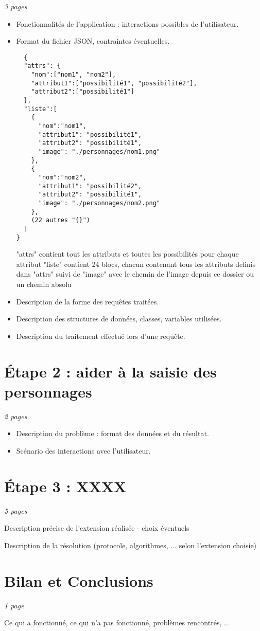 \documentclass[a4paper]{article}
\begin{document}
\emph{3 pages}

\begin{itemize}         
\item
  Fonctionnalités de l'application : interactions possibles de
  l'utilisateur.
\item
  Format du fichier JSON, contraintes éventuelles.\\
  \begin{verbatim}
  {
  "attrs": {
  	"nom":["nom1", "nom2"], 
  	"attribut1":["possibilité1", "possibilité2"],
  	"attribut2":["possibilité1"]
  },
  "liste":[
    {
      "nom":"nom1",
      "attribut1": "possibilité1",
      "attribut2": "possibilité1",
      "image": "./personnages/nom1.png"
    },
    {
      "nom":"nom2",
      "attribut1": "possibilité2",
      "attribut2": "possibilité1",
      "image": "./personnages/nom2.png"
    },
    (22 autres "{}")
  ]
}

\end{verbatim}
 "attrs" contient tout les attributs et toutes les possibilités pour chaque attribut "liste" contient 24 blocs, chacun contenant tous les attributs definis dans "attrs" suivi de "image" avec le chemin de l'image depuis ce dossier ou un chemin absolu
\newline
\item
  Description de la forme des requêtes traitées.
\item
  Description des structures de données, classes, variables utilisées.
\item
  Description du traitement effectué lors d'une requête.
\end{itemize}


\section{Étape 2 : aider  à la saisie  des personnages}

\emph{2 pages}

\begin{itemize}    
\item
  Description du problème : format des données et du résultat.
\item
  Scénario des interactions avec l'utilisateur.
\end{itemize}

\section{Étape 3 : XXXX}

\emph{5 pages}

Description précise de l'extension réalisée - choix éventuels

Description de la résolution (protocole, algorithmes, ... selon l'extension choisie)

\section{Bilan et Conclusions}

\emph{1 page}

Ce qui a fonctionné, ce qui n'a pas fonctionné, problèmes rencontrés, ...
\end{document}
